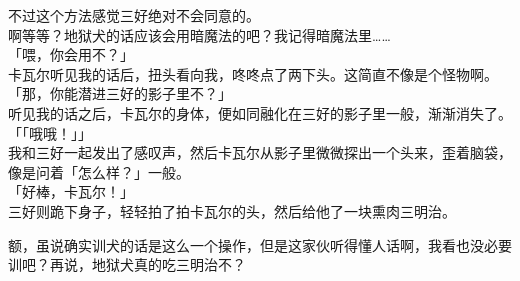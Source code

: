 不过这个方法感觉三好绝对不会同意的。\\

啊等等？地狱犬的话应该会用暗魔法的吧？我记得暗魔法里……\\

「喂，你会用不？」\\

卡瓦尔听见我的话后，扭头看向我，咚咚点了两下头。这简直不像是个怪物啊。\\

「那，你能潜进三好的影子里不？」\\

听见我的话之后，卡瓦尔的身体，便如同融化在三好的影子里一般，渐渐消失了。\\

「「哦哦！」」\\

我和三好一起发出了感叹声，然后卡瓦尔从影子里微微探出一个头来，歪着脑袋，像是问着「怎么样？」一般。\\

「好棒，卡瓦尔！」\\

三好则跪下身子，轻轻拍了拍卡瓦尔的头，然后给他了一块熏肉三明治。

额，虽说确实训犬的话是这么一个操作，但是这家伙听得懂人话啊，我看也没必要训吧？再说，地狱犬真的吃三明治不？

